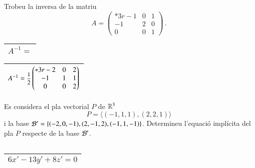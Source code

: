 \documentclass[11pt,catalan]{article}
\begin{document}
\begin{enunciat}
Trobeu la inversa de la matriu 
\[
  A = \begin{pmatrix}{*{3}r} -1 & 0 & 1\\ -1 & 2 & 0\\ 0 & 0 & 1\end{pmatrix}\,.
\]
\end{enunciat}

\begin{quadricula}
\begin{tabular}{|L{5cm}{1.25cm}|}
\hline
$A^{-1}=$ \\
\hline
\end{tabular}
\end{quadricula}

\begin{solucio}
\begin{center}
\begin{tabular}{|C{5cm}{1.25cm}|}
\hline
$A^{-1}=\deufrac{1}{2}\begin{pmatrix}{*{3}r} -2 & 0 & 2\\ -1 & 1 & 1\\ 0 & 0 & 2\end{pmatrix}$ \\
\hline
\end{tabular}
\end{center}
\end{solucio}


\begin{enunciat}
Es considera el pla vectorial $P$ de $\rn 3$
\[
  P = \langle (-1,1,1), (2,2,1) \rangle
\]
i la base $\cal B'=\{(-2,0,-1),(2,-1,2),(-1,1,-1)\}$. Determineu l'equació implícita del pla $P$ respecte de la base $\cal B'$.
\end{enunciat}

\begin{quadricula}
\begin{tabular}{|C{5cm}{0.5cm}|}
\hline
 \\
\hline
\end{tabular}
\end{quadricula}

\begin{solucio}
\begin{center}
\begin{tabular}{|C{5cm}{0.5cm}|}
\hline
$6 x' - 13 y' + 8 z' = 0$ \\
\hline
\end{tabular}
\end{center}
\end{solucio}
\end{document}
